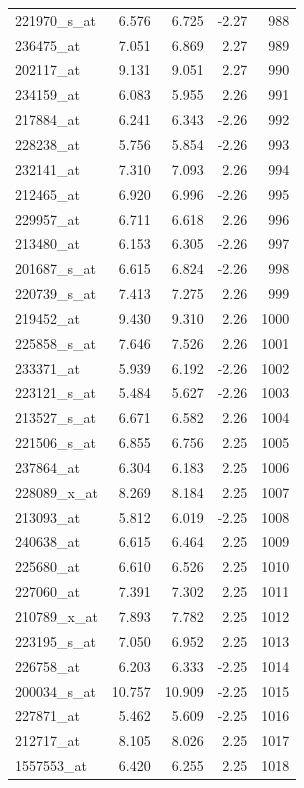\begin{footnotesize}
\begin{longtable}{lrrrr}
221970\_s\_at & 6.576 & 6.725 & -2.27 & 988 \\
236475\_at & 7.051 & 6.869 & 2.27 & 989 \\
202117\_at & 9.131 & 9.051 & 2.27 & 990 \\
234159\_at & 6.083 & 5.955 & 2.26 & 991 \\
217884\_at & 6.241 & 6.343 & -2.26 & 992 \\
228238\_at & 5.756 & 5.854 & -2.26 & 993 \\
232141\_at & 7.310 & 7.093 & 2.26 & 994 \\
212465\_at & 6.920 & 6.996 & -2.26 & 995 \\
229957\_at & 6.711 & 6.618 & 2.26 & 996 \\
213480\_at & 6.153 & 6.305 & -2.26 & 997 \\
201687\_s\_at & 6.615 & 6.824 & -2.26 & 998 \\
220739\_s\_at & 7.413 & 7.275 & 2.26 & 999 \\
219452\_at & 9.430 & 9.310 & 2.26 & 1000 \\
225858\_s\_at & 7.646 & 7.526 & 2.26 & 1001 \\
233371\_at & 5.939 & 6.192 & -2.26 & 1002 \\
223121\_s\_at & 5.484 & 5.627 & -2.26 & 1003 \\
213527\_s\_at & 6.671 & 6.582 & 2.26 & 1004 \\
221506\_s\_at & 6.855 & 6.756 & 2.25 & 1005 \\
237864\_at & 6.304 & 6.183 & 2.25 & 1006 \\
228089\_x\_at & 8.269 & 8.184 & 2.25 & 1007 \\
213093\_at & 5.812 & 6.019 & -2.25 & 1008 \\
240638\_at & 6.615 & 6.464 & 2.25 & 1009 \\
225680\_at & 6.610 & 6.526 & 2.25 & 1010 \\
227060\_at & 7.391 & 7.302 & 2.25 & 1011 \\
210789\_x\_at & 7.893 & 7.782 & 2.25 & 1012 \\
223195\_s\_at & 7.050 & 6.952 & 2.25 & 1013 \\
226758\_at & 6.203 & 6.333 & -2.25 & 1014 \\
200034\_s\_at & 10.757 & 10.909 & -2.25 & 1015 \\
227871\_at & 5.462 & 5.609 & -2.25 & 1016 \\
212717\_at & 8.105 & 8.026 & 2.25 & 1017 \\
1557553\_at & 6.420 & 6.255 & 2.25 & 1018 \\

\end{longtable}
\end{footnotesize}
